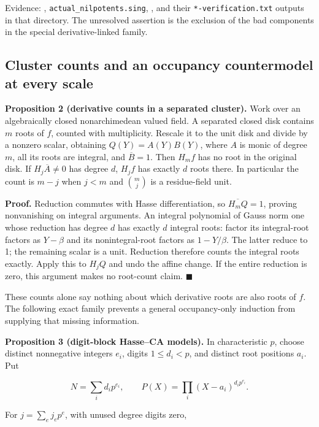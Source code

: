 \documentclass[
  british,
  10pt,
]{article}
\begin{document}
Evidence: ,
\texttt{actual\_nilpotents.sing}, ,
and their \texttt{*-verification.txt} outputs in that directory. The
unresolved assertion is the exclusion of the bad components in the
special derivative-linked family.

\subsection{Cluster counts and an occupancy countermodel at every
scale}\label{cluster-counts-and-an-occupancy-countermodel-at-every-scale}

\textbf{Proposition 2 (derivative counts in a separated cluster).} Work
over an algebraically closed nonarchimedean valued field. A separated
closed disk contains \(m\) roots of \(f\), counted with multiplicity.
Rescale it to the unit disk and divide by a nonzero scalar, obtaining
\(Q(Y)=A(Y)B(Y)\), where \(A\) is monic of degree \(m\), all its roots
are integral, and \(\overline B=1\). Then \(H_mf\) has no root in the
original disk. If \(H_j\overline A\ne0\) has degree \(d\), \(H_jf\) has
exactly \(d\) roots there. In particular the count is \(m-j\) when
\(j<m\) and \(\binom mj\) is a residue-field unit.

\textbf{Proof.} Reduction commutes with Hasse differentiation, so
\(\overline{H_mQ}=1\), proving nonvanishing on integral arguments. An
integral polynomial of Gauss norm one whose reduction has degree \(d\)
has exactly \(d\) integral roots: factor its integral-root factors as
\(Y-\beta\) and its nonintegral-root factors as \(1-Y/\beta\). The
latter reduce to 1; the remaining scalar is a unit. Reduction therefore
counts the integral roots exactly. Apply this to \(H_jQ\) and undo the
affine change. If the entire reduction is zero, this argument makes no
root-count claim. \(\blacksquare\)

These counts alone say nothing about which derivative roots are also
roots of \(f\). The following exact family prevents a general
occupancy-only induction from supplying that missing information.

\textbf{Proposition 3 (digit-block Hasse--CA models).} In characteristic
\(p\), choose distinct nonnegative integers \(e_i\), digits
\(1\le d_i<p\), and distinct root positions \(a_i\). Put

\[
 N=\sum_i d_ip^{e_i},\qquad P(X)=\prod_i(X-a_i)^{d_ip^{e_i}}.
\]

For \(j=\sum_ej_ep^e\), with unused degree digits zero,
\end{document}
